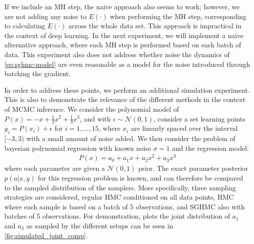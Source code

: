 If we include an MH step, the naive approach also seems to work; however, we are not adding any noise to $E(\cdot)$ when performing the MH step, corresponding to calculating $E(\cdot)$ across the whole data set. 
This approach is impractical in the context of deep learning.
In the next experiment, we will implement a naive alternative approach, where each MH step is performed based on each batch of data. 
This experiment also does not address whether noise the dynamics of \cref{eq:sghmc-model} are even reasonable as a model for the noise introduced through batching the gradient. 

In order to address these points, we perform an additional simulation experiment. 
This is also to demonstrate the relevance of the different methods in the context of MCMC inference.
We consider the polynomial model of $P(x) = -x + \frac{1}{2}x^2 + \frac{1}{3}x^3$, 
and with $\epsilon \sim \mathcal{N}(0, 1)$, consider a set learning points $y_i = P(x_i) + \epsilon$ for $i=1,\dots,15$, where $x_i$ are linearly spaced over the interval $[-3, 3)$ with a small amount of noise added. 
We then consider the problem of bayesian polynomial regression with known noise $\sigma=1$ and the regression model:
\begin{align*}
    P(x) = a_0 + a_1 x+a_2 x^2 + a_3 x^3
\end{align*}
where each parameter are given a $\mathcal{N}(0, 1)$ prior.
The exact parameter posterior $p(a|x,y)$ for this regression problem is known, and can therefore be compared to the sampled distribution of the samplers. 
More specifically, three sampling strategies are considered, regular HMC conditioned on all data points, HMC where each sample is based on a batch of 5 observations, and SGHMC also with batches of 5 observations.
For demonstration, plots the joint distribution of $a_1$ and $a_3$ as sampled by the different setups can be seen in \cref{fig:simulated_joint_comp}.
